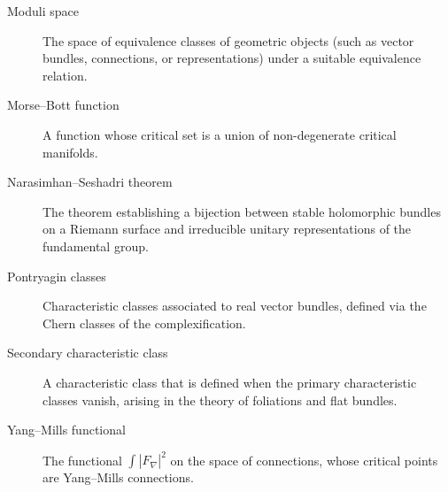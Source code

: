 \begin{description}
    \item[Moduli space] The space of equivalence classes of geometric objects (such as vector bundles, connections, or representations) under a suitable equivalence relation.
    \item[Morse--Bott function] A function whose critical set is a union of non-degenerate critical manifolds.
    \item[Narasimhan--Seshadri theorem] The theorem establishing a bijection between stable holomorphic bundles on a Riemann surface and irreducible unitary representations of the fundamental group.
    \item[Pontryagin classes] Characteristic classes associated to real vector bundles, defined via the Chern classes of the complexification.
    \item[Secondary characteristic class] A characteristic class that is defined when the primary characteristic classes vanish, arising in the theory of foliations and flat bundles.
    \item[Yang--Mills functional] The functional \(\int |F_\nabla|^2\) on the space of connections, whose critical points are Yang--Mills connections.
\end{description}
